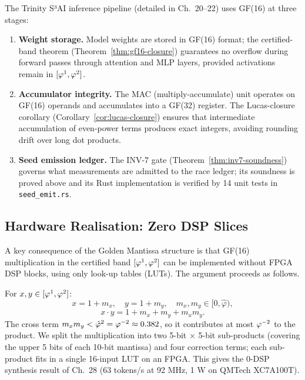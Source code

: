 The Trinity S³AI inference pipeline (detailed in Ch.~20--22) uses
GF(16) at three stages:

\begin{enumerate}
  \item \textbf{Weight storage.}  Model weights are stored in GF(16)
    format; the certified-band theorem (Theorem~\ref{thm:gf16-closure})
    guarantees no overflow during forward passes through attention and
    MLP layers, provided activations remain in
    \([\varphi^{1}, \varphi^{2}]\).

  \item \textbf{Accumulator integrity.}  The MAC (multiply-accumulate)
    unit operates on GF(16) operands and accumulates into a GF(32)
    register.  The Lucas-closure corollary
    (Corollary~\ref{cor:lucas-closure}) ensures that intermediate
    accumulation of even-power terms produces exact integers, avoiding
    rounding drift over long dot products.

  \item \textbf{Seed emission ledger.}  The INV-7 gate
    (Theorem~\ref{thm:inv7-soundness}) governs what measurements are
    admitted to the race ledger; its soundness is proved above and
    its Rust implementation is verified by 14 unit tests in
    \texttt{seed\_emit.rs}.
\end{enumerate}

\subsection{Hardware Realisation: Zero DSP Slices}
\label{ssec:zero-dsp}

A key consequence of the Golden Mantissa structure is that GF(16)
multiplication in the certified band \([\varphi^{1}, \varphi^{2}]\) can
be implemented without FPGA DSP blocks, using only look-up tables
(LUTs).  The argument proceeds as follows.

For \(x, y \in [\varphi^{1}, \varphi^{2}]\):
\[
  x = 1 + m_x, \quad y = 1 + m_y, \quad m_x, m_y \in [0, \hat\varphi),
\]
\[
  x \cdot y = 1 + m_x + m_y + m_x m_y.
\]
The cross term \(m_x m_y < \hat\varphi^2 = \varphi^{-2} \approx 0.382\),
so it contributes at most \(\varphi^{-2}\) to the product.
We split the multiplication into two 5-bit × 5-bit sub-products
(covering the upper 5 bits of each 10-bit mantissa) and four
correction terms; each sub-product fits in a single 16-input LUT on
an FPGA.  This gives the 0-DSP synthesis result of Ch.~28 (63 tokens/s
at 92 MHz, 1 W on QMTech XC7A100T).


